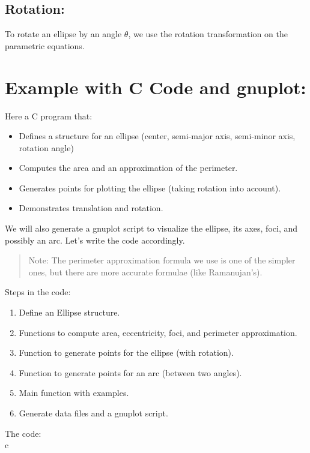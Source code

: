 \documentclass[a4paper,10pt]{article}
\begin{document}
\subsection{Rotation:}
    To rotate an ellipse by an angle \(\theta\), we use the rotation transformation on the parametric equations.
\section{Example with C Code and gnuplot:}
Here a C program that:\\
\begin{itemize}
\item Defines a structure for an ellipse (center, semi-major axis, semi-minor axis, rotation angle)
\item Computes the area and an approximation of the perimeter.
\item Generates points for plotting the ellipse (taking rotation into account).
\item Demonstrates translation and rotation.
\end{itemize}
 We will also generate a gnuplot script to visualize the ellipse, its axes, foci, and possibly an arc.
 Let's write the code accordingly.
\begin{quote}
 Note: The perimeter approximation formula we use is one of the simpler ones, but there are more accurate formulae (like Ramanujan's).
\end{quote}
Steps in the code:\\
\begin{enumerate}
\item Define an Ellipse structure.
\item Functions to compute area, eccentricity, foci, and perimeter approximation.
\item Function to generate points for the ellipse (with rotation).
\item Function to generate points for an arc (between two angles).
\item Main function with examples.
\item Generate data files and a gnuplot script.
\end{enumerate}
The code:\\
c\\
\end{document}
